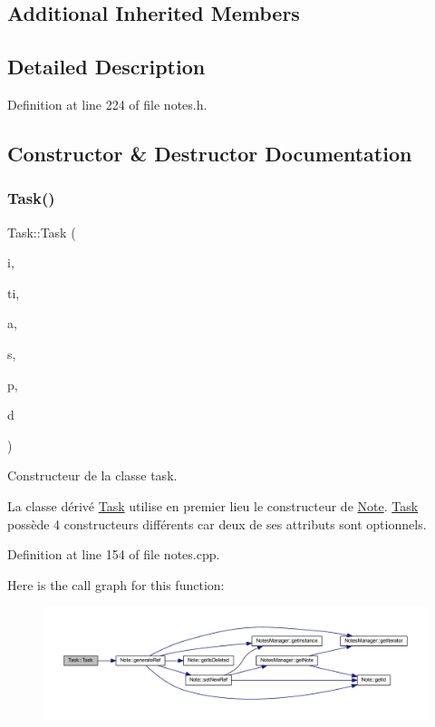 \subsection*{Additional Inherited Members}


\subsection{Detailed Description}


Definition at line 224 of file notes.\+h.



\subsection{Constructor \& Destructor Documentation}
\mbox{\label{class_task_a08a0f57803d8ef35f687f23f759e9f0c}} 
\subsubsection{\texorpdfstring{Task()}{Task()}}
{\footnotesize\ttfamily Task\+::\+Task (\begin{DoxyParamCaption}\item[{const Q\+String \&}]{i,  }\item[{const Q\+String \&}]{ti,  }\item[{const Q\+String \&}]{a,  }\item[{E\+N\+U\+M\+::\+Status\+Type}]{s,  }\item[{unsigned int}]{p,  }\item[{const Q\+Date\+Time}]{d }\end{DoxyParamCaption})}



Constructeur de la classe task. 

La classe dérivé \hyperlink{class_task}{Task} utilise en premier lieu le constructeur de \hyperlink{class_note}{Note}. \hyperlink{class_task}{Task} possède 4 constructeurs différents car deux de ses attributs sont optionnels. 

Definition at line 154 of file notes.\+cpp.

Here is the call graph for this function\+:\nopagebreak
\begin{figure}[H]
\begin{center}
\leavevmode
\includegraphics[width=350pt]{class_task_a08a0f57803d8ef35f687f23f759e9f0c_cgraph}
\end{center}
\end{figure}


